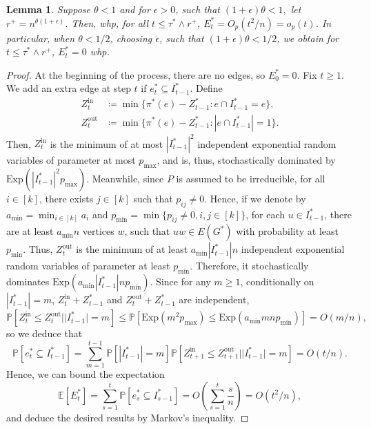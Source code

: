 \documentclass[11pt]{article}
\numberwithin{equation}{section}
\newtheorem{lemma}[theorem]{Lemma}
\theoremstyle{definition}
\newcommand\bE{{\mathbb E}}
\newcommand\bP{{\mathbb P}}
\begin{document}
\begin{lemma}
\label{no_fail}
Suppose $\theta < 1$ and for $\epsilon > 0$, such that $(1+\epsilon)\theta < 1,$ let $r^+ = n^{\theta(1+\epsilon)}$. Then, whp, for all $t\leq \tau^* \land r^+$, $E^*_{t} = O_p(t^2/n) = o_p(t)$. In particular, when $\theta < 1/2$, choosing $\epsilon$, such that $(1+\epsilon)\theta < 1/2$, we obtain for $t\leq \tau^* \land r^+$, $E_t^* = 0$ whp.
\end{lemma}
\begin{proof}
At the beginning of the process, there are no edges, so $E^*_0 = 0$. Fix $t \geq 1$. We add an extra edge at step $t$ if $e^*_{t} \subseteq I^*_{t-1}$. Define
\begin{equation*}
    \begin{split}
        Z^{\mathrm{in}}_{t} &\coloneqq \min\{\pi^*(e)-Z^*_{t-1}: e\cap I^*_{t-1} =e \},\\
        Z^{\mathrm{out}}_{t} &\coloneqq \min\{\pi^*(e)-Z^*_{t-1}: |e\cap I^*_{t-1}|=1 \}.
    \end{split}
\end{equation*}
Then, $Z^{\mathrm{in}}_{t}$ is the minimum of at most $|I^*_{t-1}|^2$ independent exponential random variables of parameter at most $p_{\max}$, and is, thus, stochastically dominated by $\mathrm{Exp}(|I^*_{t-1}|^2 p_{\max})$. Meanwhile, since $P$ is assumed to be irreducible, for all $i\in[k]$, there exists $j \in [k]$ such that $p_{ij}\neq 0$. Hence, if we denote by $a_{\min}=\min_{i\in[k]}a_i $ and $p_{\min}=\min\{p_{ij}\neq 0, i,j\in[k]\}$, for each $u \in I^*_{t-1}$, there are at least $a_{\min}n$ vertices $w$, such that $uw \in E(G^*)$ with probability at least $p_{\min}$. Thus, $Z^{\mathrm{out}}_{t}$ is the minimum of at least $a_{\min}|I^*_{t-1}|n$ independent exponential random variables of parameter at least $p_{\min}$. Therefore, it stochastically dominates $\mathrm{Exp}(a_{\min}|I^*_{t-1}|np_{\min})$. Since for any $m\geq 1$, conditionally on $|I^*_{t-1}|=m$, $Z^{\mathrm{in}}_t+Z^*_{t-1}$ and $Z^{\mathrm{out}}_t+Z^*_{t-1}$ are independent,
$$\bP[Z_{t}^{\mathrm{in}}\leq Z^{\mathrm{out}}_{t}| |I^*_{t-1}|=m] \leq \bP[\mathrm{Exp}(m^2p_{\max})\leq \mathrm{Exp}(a_{\min}mn p_{\min}) ] = O(m/n),$$
so we deduce that
\begin{equation*}
\bP[e^*_{t}\subseteq I^*_{t-1}]=\sum_{m=1}^{t-1} \bP[|I^*_{t-1}|=m] \bP[Z_{t+1}^{\mathrm{in}}\leq Z^{\mathrm{out}}_{t+1}||I^*_{t-1}|=m] = O(t/n).
\end{equation*}
 Hence, we can bound the expectation
$$ \bE[E^*_t] = \sum_{s=1}^t \bP[e^*_s \subseteq I^*_{s-1}] = O\left( \sum_{s=1}^t  \frac{s}{n}\right) = O(t^2/n),$$
and deduce the desired results by Markov's inequality.
\end{proof}
\end{document}
